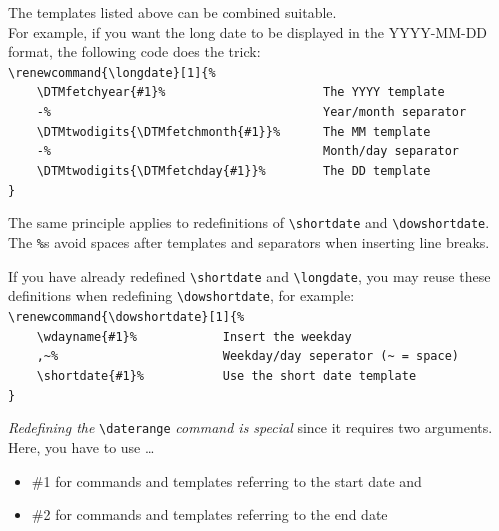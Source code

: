 \documentclass[11pt]{ltxdoc}
\begin{document}
	\bigskip
	The templates listed above can be combined suitable. \\
	For example, if you want the long date to be displayed in the \textsf{YYYY-MM-DD} format, the following code does the trick: \\
	\verb|\renewcommand{\longdate}[1]{%| \\\nopagebreak[4]
	\verb|    \DTMfetchyear{#1}%                      The YYYY template| \\\nopagebreak[4]
	\verb|    -%                                      Year/month separator| \\\nopagebreak[4]
	\verb|    \DTMtwodigits{\DTMfetchmonth{#1}}%      The MM template| \\\nopagebreak[4]
	\verb|    -%                                      Month/day separator| \\\nopagebreak[4]
	\verb|    \DTMtwodigits{\DTMfetchday{#1}}%        The DD template| \\\nopagebreak[4]
	\verb|}| \pagebreak[0]
	
	\medskip
	The same principle applies to redefinitions of \verb|\shortdate| and \verb|\dowshortdate|. \\
	The \verb|%|s avoid spaces after templates and separators when inserting line breaks.
	
	\medskip
	If you have already redefined \verb|\shortdate| and \verb|\longdate|, you may reuse these definitions when redefining \verb|\dowshortdate|, for example: \\
	\verb|\renewcommand{\dowshortdate}[1]{%| \\\nopagebreak[4]
	\verb|    \wdayname{#1}%            Insert the weekday| \\\nopagebreak[4]
	\verb|    ,~%                       Weekday/day seperator (~ = space)| \\\nopagebreak[4]
	\verb|    \shortdate{#1}%           Use the short date template| \\\nopagebreak[4]
	\verb|}| \pagebreak[0]
	
	\bigskip
	\textit{Redefining the} \verb|\daterange| \textit{command is special} since it requires two arguments. \\
	Here, you have to use \dots
	\begin{itemize}
		\item
		{\ttfamily\#1} for commands and templates referring to the start date and
		
		\item
		{\ttfamily\#2} for commands and templates referring to the end date
	\end{itemize}
	
\end{document}
